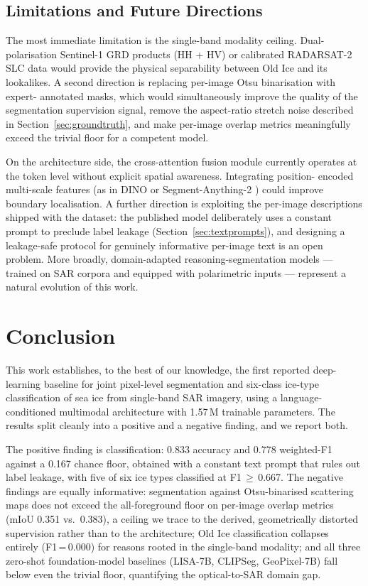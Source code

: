 \documentclass[remotesensing,article,accept,moreauthors,pdftex]{Definitions/mdpi}
\begin{document}
\subsection{Limitations and Future Directions}

The most immediate limitation is the single-band modality ceiling. Dual-
polarisation Sentinel-1 GRD products (HH + HV) or calibrated RADARSAT-2 SLC
data would provide the physical separability between Old Ice and its lookalikes.
A second direction is replacing per-image Otsu binarisation with expert-
annotated masks, which would simultaneously improve the quality of the
segmentation supervision signal, remove the aspect-ratio stretch noise
described in Section~\ref{sec:groundtruth}, and make per-image overlap metrics
meaningfully exceed the trivial floor for a competent model.

On the architecture side, the cross-attention fusion module currently operates
at the token level without explicit spatial awareness. Integrating position-
encoded multi-scale features (as in DINO \cite{caron2021emerging} or
Segment-Anything-2 \cite{ravi2024sam2}) could improve boundary localisation.
A further direction is exploiting the per-image descriptions shipped with the
dataset: the published model deliberately uses a constant prompt to preclude
label leakage (Section~\ref{sec:textprompts}), and designing a leakage-safe
protocol for genuinely informative per-image text is an open problem. More
broadly, domain-adapted reasoning-segmentation models — trained on SAR corpora
and equipped with polarimetric inputs — represent a natural evolution of this
work.

\section{Conclusion}
\label{sec:conclusion}

This work establishes, to the best of our knowledge, the first reported
deep-learning baseline for joint pixel-level segmentation and six-class
ice-type classification of sea ice from single-band SAR imagery, using a
language-conditioned multimodal architecture with 1.57\,M trainable
parameters. The results split cleanly into a positive and a negative finding,
and we report both.

The positive finding is classification: 0.833 accuracy and 0.778 weighted-F1
against a 0.167 chance floor, obtained with a constant text prompt that rules
out label leakage, with five of six ice types classified at F1\,$\geq$\,0.667.
The negative findings are equally informative: segmentation against
Otsu-binarised scattering maps does not exceed the all-foreground floor on
per-image overlap metrics (mIoU 0.351 vs.\ 0.383), a ceiling we trace to the
derived, geometrically distorted supervision rather than to the architecture;
Old Ice classification collapses entirely (F1\,=\,0.000) for reasons rooted in
the single-band modality; and all three zero-shot foundation-model baselines
(LISA-7B, CLIPSeg, GeoPixel-7B) fall below even the trivial floor,
quantifying the optical-to-SAR domain gap.
\end{document}
